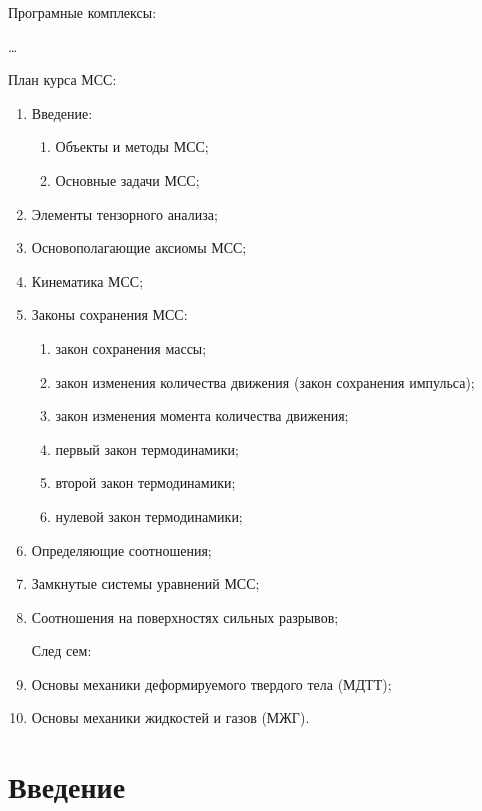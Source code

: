 

Програмные комплексы:

\dots

План курса МСС:
\begin{enumerate}
  \item Введение:
    \begin{enumerate}
      \item Объекты и методы МСС;
      \item Основные задачи МСС;
    \end{enumerate}

  \item Элементы тензорного анализа;
  \item Основополагающие аксиомы МСС;
  \item Кинематика МСС;
  \item Законы сохранения МСС:
    \begin{enumerate}
      \item закон сохранения массы;
      \item закон изменения количества движения (закон сохранения импульса);
      \item закон изменения момента количества движения;
      \item первый закон термодинамики;
      \item второй закон термодинамики;
      \item нулевой закон термодинамики;
    \end{enumerate}
  \item Определяющие соотношения;
  \item Замкнутые системы уравнений МСС;
  \item Соотношения на поверхностях сильных разрывов;

    След сем:
  \item Основы механики деформируемого твердого тела (МДТТ);
  \item Основы механики жидкостей и газов (МЖГ).
\end{enumerate}

\section{Введение}

